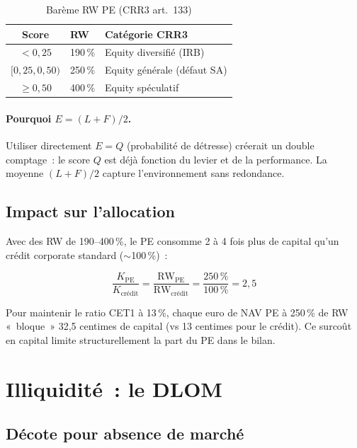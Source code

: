 \documentclass[12pt, a4paper, twoside, openright]{report}
\theoremstyle{definition}
\begin{document}
\begin{table}[htbp]
\centering
\caption{Barème RW PE (CRR3 art.~133)}
\label{tab:rw-pe}
\begin{tabular}{cll}
\toprule
Score & RW & Catégorie CRR3 \\
\midrule
$< 0{,}25$ & 190\,\% & Equity diversifié (IRB) \\
$[0{,}25, 0{,}50)$ & 250\,\% & Equity générale (défaut SA) \\
$\geq 0{,}50$ & 400\,\% & Equity spéculatif \\
\bottomrule
\end{tabular}
\end{table}

\paragraph{Pourquoi $E = (L + F)/2$.} Utiliser directement $E = Q$ (probabilité de détresse) créerait un double comptage~: le score $Q$ est déjà fonction du levier et de la performance. La moyenne $(L + F)/2$ capture l'environnement sans redondance.

\subsection{Impact sur l'allocation}

Avec des RW de 190--400\,\%, le PE consomme 2 à 4 fois plus de capital qu'un crédit corporate standard ($\sim$100\,\%)~:

\begin{equation}
\frac{K_{\text{PE}}}{K_{\text{crédit}}} = \frac{\text{RW}_{\text{PE}}}{\text{RW}_{\text{crédit}}} = \frac{250\,\%}{100\,\%} = 2{,}5
\label{eq:pe-capital-ratio}
\end{equation}

Pour maintenir le ratio CET1 à 13\,\%, chaque euro de NAV PE à 250\,\% de RW «~bloque~» 32{,}5 centimes de capital (vs 13 centimes pour le crédit). Ce surcoût en capital limite structurellement la part du PE dans le bilan.

\section{Illiquidité~: le DLOM}
\label{sec:pe:dlom}

\subsection{Décote pour absence de marché}
\end{document}
